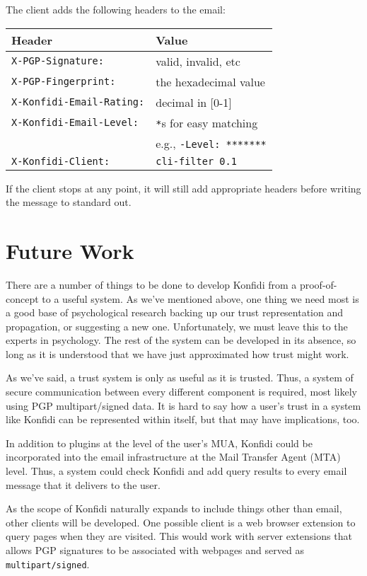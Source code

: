 \documentclass{acm_proc_article-sp}
\begin{document}
The client adds the following headers to the email:
\begin{center}
\begin{tabular}{ll}
\textbf{Header} & \textbf{Value} \\
\hline
\texttt{X-PGP-Signature:}        & valid, invalid, etc \\
\texttt{X-PGP-Fingerprint:}      & the hexadecimal value \\
\texttt{X-Konfidi-Email-Rating:} & decimal in [0-1] \\
\texttt{X-Konfidi-Email-Level:}  & \texttt{*}s for easy matching \\
                                 & e.g., \texttt{-Level: *******} \\
\texttt{X-Konfidi-Client:}       & \texttt{cli-filter 0.1} \\
\end{tabular}
\end{center}

If the client stops at any point, it will still add appropriate headers before writing the message to standard out.

\section{Future Work}
There are a number of things to be done to develop Konfidi from a proof-of-concept to a useful system.  As we've mentioned above, one thing we need most is a good base of psychological research backing up our trust representation and propagation, or suggesting a new one.  Unfortunately, we must leave this to the experts in psychology.  The rest of the system can be developed in its absence, so long as it is understood that we have just approximated how trust might work.

As we've said, a trust system is only as useful as it is trusted.  Thus, a system of secure communication between every different component is required, most likely using PGP multipart/signed data.  It is hard to say how a user's trust in a system like Konfidi can be represented within itself, but that may have implications, too.

In addition to plugins at the level of the user's MUA, Konfidi could be incorporated into the email infrastructure at the Mail Transfer Agent (MTA) level.  Thus, a system could check Konfidi and add query results to every email message that it delivers to the user.

As the scope of Konfidi naturally expands to include things other than email, other clients will be developed.  One possible client is a web browser extension to query pages when they are visited.  This would work with server extensions that allows PGP signatures to be associated with webpages and served as \texttt{multipart/signed}.
\end{document}
